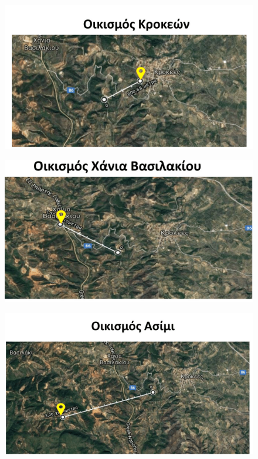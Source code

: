 \documentclass[12pt]{article}
\begin{document}
 	\begin{figure} [H]
 		\begin{center}
 			\includegraphics [scale = 0.50] {map52.png}
 		\end{center}
 	\end{figure}
 
 	\begin{figure} [H]
 		\begin{center}
 			\includegraphics [scale = 0.55] {map53.png}
 		\end{center}
 	\end{figure}
 
 	\begin{figure} [H]
 		\begin{center}
 			\includegraphics [scale = 0.55] {map54.png}
 		\end{center}
 	\end{figure}
 
\end{document}
